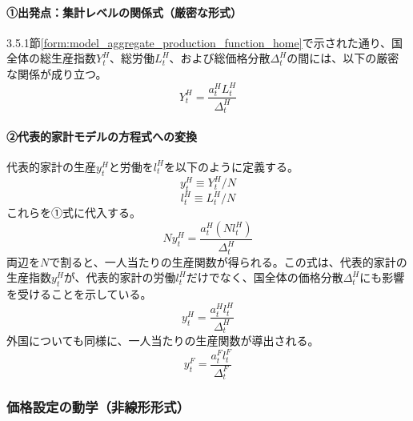\paragraph{①出発点：集計レベルの関係式（厳密な形式）}\label{sec:chapter3_final_equations_pricing_prod_origin}
3.5.1節\eqref{form:model_aggregate_production_function_home}で示された通り、国全体の総生産指数\(Y_t^H\)、総労働\(L_t^H\)、および総価格分散\(\Delta_t^H\)の間には、以下の厳密な関係が成り立つ。
\begin{equation}
Y_t^H=\frac{a_t^HL_t^H}{\Delta_t^H}
\label{form:model_final_equations_pricing_prod_agg_restated}
\end{equation}

\paragraph{②代表的家計モデルの方程式への変換}\label{sec:chapter3_final_equations_pricing_prod_ra_eq}
代表的家計の生産\(y_t^H\)と労働を\(l_t^H\)を以下のように定義する。
\begin{equation}
y_t^H\equiv Y_t^H/N
\label{form:model_final_equations_pricing_ra_y_h_def}
\end{equation}
\begin{equation}
l_t^H\equiv L_t^H/N
\label{form:model_final_equations_pricing_ra_l_h_def}
\end{equation}
これらを①式に代入する。
\begin{equation}
Ny_t^H=\frac{a_t^H(Nl_t^H)}{\Delta_t^H}
\label{form:model_final_equations_pricing_prod_derivation}
\end{equation}
両辺を\(N\)で割ると、一人当たりの生産関数が得られる。この式は、代表的家計の生産指数\(y_t^H\)が、代表的家計の労働\(l_t^H\)だけでなく、国全体の価格分散\(\Delta_t^H\)にも影響を受けることを示している。
\begin{equation}
y_t^H=\frac{a_t^Hl_t^H}{\Delta_t^H}
\label{form:model_final_equations_pricing_prod_h}
\end{equation}
外国についても同様に、一人当たりの生産関数が導出される。
\begin{equation}
y_t^F=\frac{a_t^Fl_t^F}{\Delta_t^F}
\label{form:model_final_equations_pricing_prod_f}
\end{equation}

\subsubsection{価格設定の動学（非線形形式）}
\label{sec:chapter3_final_equations_pricing_dynamics}
